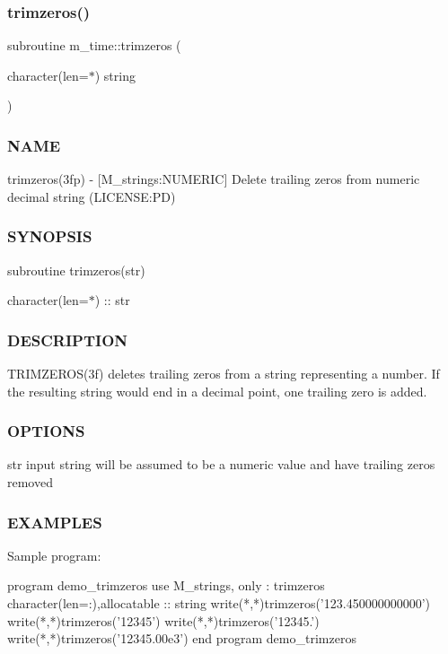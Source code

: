 \subsubsection{\texorpdfstring{trimzeros()}{trimzeros()}}
{\footnotesize\ttfamily subroutine m\+\_\+time\+::trimzeros (\begin{DoxyParamCaption}\item[{character(len=$\ast$)}]{string }\end{DoxyParamCaption})\hspace{0.3cm}{\ttfamily [private]}}



\subsubsection*{N\+A\+ME}

trimzeros(3fp) -\/ \mbox{[}M\+\_\+strings\+:N\+U\+M\+E\+R\+IC\mbox{]} Delete trailing zeros from numeric decimal string (L\+I\+C\+E\+N\+SE\+:PD) \subsubsection*{S\+Y\+N\+O\+P\+S\+IS}

subroutine trimzeros(str)

character(len=$\ast$) \+:\+: str \subsubsection*{D\+E\+S\+C\+R\+I\+P\+T\+I\+ON}

T\+R\+I\+M\+Z\+E\+R\+O\+S(3f) deletes trailing zeros from a string representing a number. If the resulting string would end in a decimal point, one trailing zero is added. \subsubsection*{O\+P\+T\+I\+O\+NS}

str input string will be assumed to be a numeric value and have trailing zeros removed \subsubsection*{E\+X\+A\+M\+P\+L\+ES}

\begin{DoxyVerb}Sample program:

   program demo_trimzeros
   use M_strings, only : trimzeros
   character(len=:),allocatable :: string
      write(*,*)trimzeros('123.450000000000')
      write(*,*)trimzeros('12345')
      write(*,*)trimzeros('12345.')
      write(*,*)trimzeros('12345.00e3')
   end program demo_trimzeros
\end{DoxyVerb}


